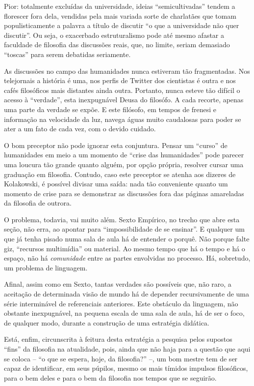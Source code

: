 \documentclass[12pt,a4paper]{article}
\begin{document}
	\newpage

	Pior: totalmente excluídas da universidade, ideias “semicultivadas”
	tendem a florescer fora dela, vendidas pela mais variada sorte de 
	charlatães que tomam populisticamente a palavra a título de discutir 
	“o que a universidade não quer discutir”. Ou seja, o exacerbado 
	estruturalismo pode até mesmo afastar a faculdade de filosofia das 
	discussões reais, que, no limite, seriam demasiado “toscas” para serem 
	debatidas seriamente. 

	As discussões no campo das humanidades nunca estiveram tão 
	fragmentadas. Nos telejornais a história é uma, nos perfis de Twitter 
	dos cientistas é outra e nos cafés filosóficos mais distantes ainda 
	outra. Portanto, nunca esteve tão difícil o acesso à “verdade”, esta 
	inexpugnável Deusa do filosófo. A cada recorte, apenas uma parte da 
	verdade se expõe. E este filósofo, em tempos de frenesi e informação 
	na velocidade da luz, navega águas muito caudalosas para poder se 
	ater a um fato de cada vez, com o devido cuidado. 

	O bom preceptor não pode ignorar esta conjuntura. Pensar um “curso” 
	de humanidades em meio a um momento de “crise das humanidades” pode 
	parecer uma loucura tão grande quanto alguém, por opção própria, 
	resolver cursar uma graduação em filosofia. Contudo, caso este 
	preceptor se atenha aos dizeres de Kolakowski, é possível divisar 
	uma saída: nada tão conveniente quanto um momento de 
	crise para se demonstrar as discussões fora das páginas amareladas 
	da filosofia de outrora. 

	O problema, todavia, vai muito além. Sexto Empírico, no trecho que 
	abre esta seção, não erra, ao apontar para “impossibilidade de se 
	ensinar”. E qualquer um que já tenha pisado numa sala de aula há de 
	entender o porquê. Não porque falte giz, “recursos multimídia” ou 
	material. Ao mesmo tempo que há o tempo e há o espaço, não há 
	\textit{comunidade} entre as partes envolvidas no processo. Há, 
	sobretudo, um problema de linguagem. 

	Afinal, assim como em Sexto, tantas verdades são possíveis que, 
	não raro, a aceitação de determinada visão de mundo há de 
	depender recursivamente de uma série interminável de referenciais 
	anteriores. Este obstáculo da linguagem, não obstante inexpugnável, 
	na pequena escala de uma sala de aula, há de ser o foco, de qualquer 
	modo, durante a construção de uma estratégia didática. 

	Está, enfim, circunscrita à feitura desta estratégia a pesquisa 
	pelos supostos “fins” da filosofia na atualidade, pois, ainda que 
	não haja para a questão que aqui se coloca -- “o que se espera, 
	hoje, da filosofia?” --, um bom mestre tem de ser capaz de 
	identificar, em seus púpilos, mesmo os mais tímidos impulsos 
	filosóficos, para o bem deles e para o bem da filosofia nos 
	tempos que se seguirão. 
\end{document}
